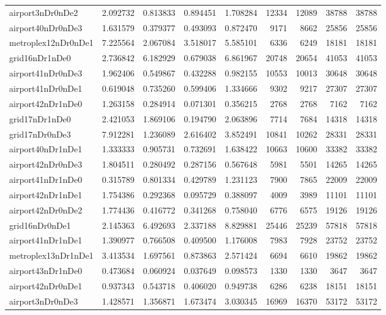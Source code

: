 \begin{longtable}{|l|r|r|r|r|r|r|r|r|}
airport3nDr0nDe2 & 2.092732 & 0.813833 & 0.894451 & 1.708284 & 12334 & 12089 & 38788 & 38788 \\
airport40nDr0nDe3 & 1.631579 & 0.379377 & 0.493093 & 0.872470 & 9171 & 8662 & 25856 & 25856 \\
metroplex12nDr0nDe1 & 7.225564 & 2.067084 & 3.518017 & 5.585101 & 6336 & 6249 & 18181 & 18181 \\
grid16nDr1nDe0 & 2.736842 & 6.182929 & 0.679038 & 6.861967 & 20748 & 20654 & 41053 & 41053 \\
airport41nDr0nDe3 & 1.962406 & 0.549867 & 0.432288 & 0.982155 & 10553 & 10013 & 30648 & 30648 \\
airport41nDr0nDe1 & 0.619048 & 0.735260 & 0.599406 & 1.334666 & 9302 & 9217 & 27307 & 27307 \\
airport42nDr1nDe0 & 1.263158 & 0.284914 & 0.071301 & 0.356215 & 2768 & 2768 & 7162 & 7162 \\
grid17nDr1nDe0 & 2.421053 & 1.869106 & 0.194790 & 2.063896 & 7714 & 7684 & 14318 & 14318 \\
grid17nDr0nDe3 & 7.912281 & 1.236089 & 2.616402 & 3.852491 & 10841 & 10262 & 28331 & 28331 \\
airport40nDr1nDe1 & 1.333333 & 0.905731 & 0.732691 & 1.638422 & 10663 & 10600 & 33382 & 33382 \\
airport42nDr0nDe3 & 1.804511 & 0.280492 & 0.287156 & 0.567648 & 5981 & 5501 & 14265 & 14265 \\
airport41nDr1nDe0 & 0.315789 & 0.801334 & 0.429789 & 1.231123 & 7900 & 7865 & 22009 & 22009 \\
airport42nDr1nDe1 & 1.754386 & 0.292368 & 0.095729 & 0.388097 & 4009 & 3989 & 11101 & 11101 \\
airport42nDr0nDe2 & 1.774436 & 0.416772 & 0.341268 & 0.758040 & 6776 & 6575 & 19126 & 19126 \\
grid16nDr0nDe1 & 2.145363 & 6.492693 & 2.337188 & 8.829881 & 25446 & 25239 & 57818 & 57818 \\
airport41nDr1nDe1 & 1.390977 & 0.766508 & 0.409500 & 1.176008 & 7983 & 7928 & 23752 & 23752 \\
metroplex13nDr1nDe1 & 3.413534 & 1.697561 & 0.873863 & 2.571424 & 6694 & 6610 & 19862 & 19862 \\
airport43nDr1nDe0 & 0.473684 & 0.060924 & 0.037649 & 0.098573 & 1330 & 1330 & 3647 & 3647 \\
airport42nDr0nDe1 & 0.937343 & 0.543718 & 0.406020 & 0.949738 & 6286 & 6238 & 18151 & 18151 \\
airport3nDr0nDe3 & 1.428571 & 1.356871 & 1.673474 & 3.030345 & 16969 & 16370 & 53172 & 53172 \\

\end{longtable}
